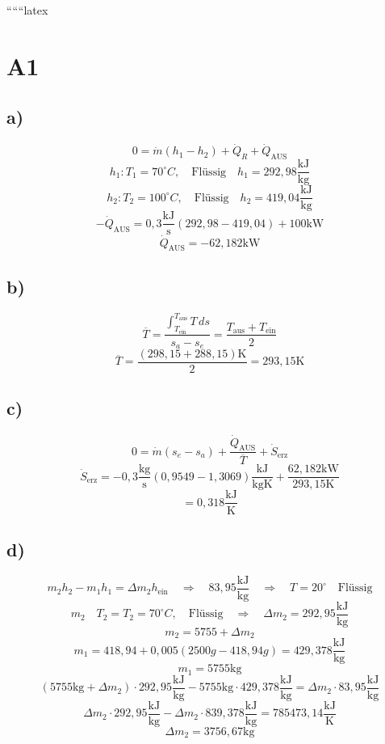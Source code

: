 
``````latex


\section*{A1}

\subsection*{a)}
\[
0 = \dot{m} (h_1 - h_2) + \dot{Q}_R + \dot{Q}_{\text{AUS}}
\]
\[
h_1: T_1 = 70^\circ C, \quad \text{Flüssig} \quad h_1 = 292,98 \frac{\text{kJ}}{\text{kg}}
\]
\[
h_2: T_2 = 100^\circ C, \quad \text{Flüssig} \quad h_2 = 419,04 \frac{\text{kJ}}{\text{kg}}
\]
\[
-\dot{Q}_{\text{AUS}} = 0,3 \frac{\text{kJ}}{\text{s}} (292,98 - 419,04) + 100 \text{kW}
\]
\[
\dot{Q}_{\text{AUS}} = -62,182 \text{kW}
\]

\subsection*{b)}
\[
\overline{T} = \frac{\int_{T_{\text{ein}}}^{T_{\text{aus}}} T \, ds}{s_a - s_e} = \frac{T_{\text{aus}} + T_{\text{ein}}}{2}
\]
\[
\overline{T} = \frac{(298,15 + 288,15) \text{K}}{2} = 293,15 \text{K}
\]

\subsection*{c)}
\[
0 = \dot{m} (s_e - s_a) + \frac{\dot{Q}_{\text{AUS}}}{\overline{T}} + \dot{S}_{\text{erz}}
\]
\[
\dot{S}_{\text{erz}} = -0,3 \frac{\text{kg}}{\text{s}} \left(0,9549 - 1,3069 \right) \frac{\text{kJ}}{\text{kgK}} + \frac{62,182 \text{kW}}{293,15 \text{K}}
\]
\[
= 0,318 \frac{\text{kJ}}{\text{K}}
\]

\subsection*{d)}
\[
m_2 h_2 - m_1 h_1 = \Delta m_2 h_{\text{ein}} \quad \Rightarrow \quad 83,95 \frac{\text{kJ}}{\text{kg}} \quad \Rightarrow \quad T = 20^\circ \quad \text{Flüssig}
\]
\[
m_2 \quad T_2 = T_2 = 70^\circ C, \quad \text{Flüssig} \quad \Rightarrow \quad \Delta m_2 = 292,95 \frac{\text{kJ}}{\text{kg}}
\]
\[
m_2 = 5755 + \Delta m_2
\]
\[
m_1 = 418,94 + 0,005 (2500 g - 418,94 g) = 429,378 \frac{\text{kJ}}{\text{kg}}
\]
\[
m_1 = 5755 \text{kg}
\]
\[
(5755 \text{kg} + \Delta m_2) \cdot 292,95 \frac{\text{kJ}}{\text{kg}} - 5755 \text{kg} \cdot 429,378 \frac{\text{kJ}}{\text{kg}} = \Delta m_2 \cdot 83,95 \frac{\text{kJ}}{\text{kg}}
\]
\[
\Delta m_2 \cdot 292,95 \frac{\text{kJ}}{\text{kg}} - \Delta m_2 \cdot 839,378 \frac{\text{kJ}}{\text{kg}} = 785473,14 \frac{\text{kJ}}{\text{K}}
\]
\[
\Delta m_2 = 3756,67 \text{kg}
\]


